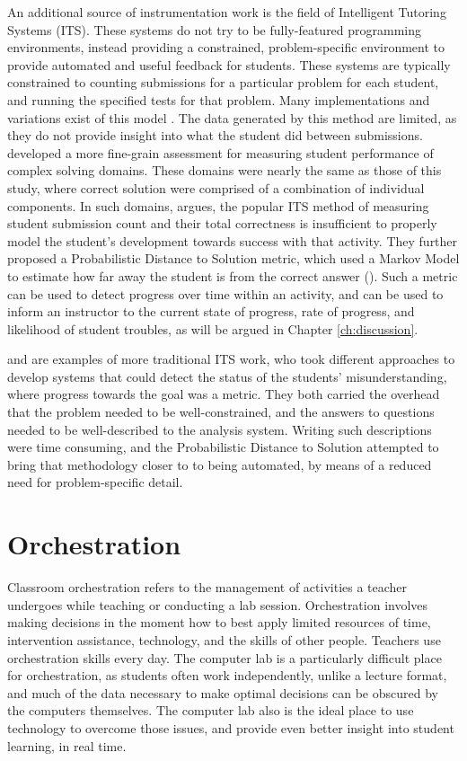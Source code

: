 An additional source of instrumentation work is the field of Intelligent Tutoring Systems (ITS). These systems do not try to be fully-featured programming environments, instead providing a constrained, problem-specific environment to provide automated and useful feedback for students. These systems are typically constrained to counting submissions for a particular problem for each student, and running the specified tests for that problem. Many implementations and variations exist of this model \citep{ihantola2010review}. The data generated by this method are limited, as they do not provide insight into what the student did between submissions. \citet{sudol2012calculating} developed a more fine-grain assessment for measuring student performance of complex solving domains. These domains were nearly the same as those of this study, where correct solution were comprised of a combination of individual components. In such domains, \citeauthor{sudol2012calculating} argues, the popular ITS method of measuring student submission count and their total correctness is insufficient to properly model the student's development towards success with that activity. They further proposed a Probabilistic Distance to Solution metric, which used a Markov Model to estimate how far away the student is from the correct answer (\citeyear{sudol2012calculating}).  Such a metric can be used to detect progress over time within an activity, and can be used to inform an instructor to the current state of progress, rate of progress, and likelihood of student troubles, as will be argued in Chapter \ref{ch:discussion}.

\citet{le2007using} and \citet{mitrovic2003intelligent} are examples of more traditional ITS work, who took different approaches to develop systems that could detect the status of the students' misunderstanding, where progress towards the goal was a metric. They both carried the overhead that the problem needed to be well-constrained, and the answers to questions needed to be well-described to the analysis system. Writing such descriptions were time consuming, and the Probabilistic Distance to Solution \citep{sudol2012calculating} attempted to bring that methodology closer to to being automated, by means of a reduced need for problem-specific detail.


\section{Orchestration}
Classroom orchestration refers to the management of activities a teacher undergoes while teaching or conducting a lab session. Orchestration involves making decisions in the moment how to best apply limited resources of time, intervention assistance, technology, and the skills of other people. Teachers use orchestration skills every day. The computer lab is a particularly difficult place for orchestration, as students often work independently, unlike a lecture format, and much of the data necessary to make optimal decisions can be obscured by the computers themselves. The computer lab also is the ideal place to use technology to overcome those issues, and provide even better insight into student learning, in real time.

